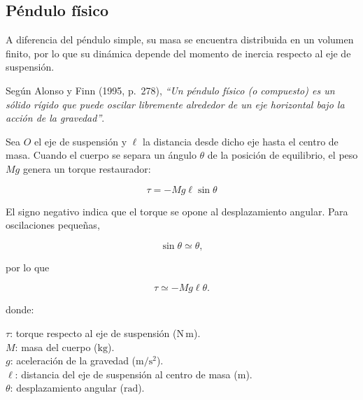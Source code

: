 \documentclass[11pt,a4paper]{article}
\newenvironment{subsectionbody}
{%
    \begin{list}{}{%
        \setlength{\leftmargin}{0.6cm}%
        \setlength{\rightmargin}{0cm}%
        \setlength{\topsep}{0pt}%
        \setlength{\partopsep}{0pt}%
        \setlength{\parsep}{0pt}%
        \setlength{\itemsep}{0pt}%
    }%
    \item\relax
}
{%
    \end{list}
}
\begin{document}
\subsection{Péndulo físico}
\begin{subsectionbody}

A diferencia del péndulo simple, su masa se encuentra distribuida en un volumen finito,
por lo que su dinámica depende del momento de inercia respecto al eje
de suspensión.

Según Alonso y Finn (1995, p.~278), \textit{``Un péndulo físico (o
compuesto) es un sólido rígido que puede oscilar libremente alrededor
de un eje horizontal bajo la acción de la gravedad''}.

Sea $O$ el eje de suspensión y $\ell$ la distancia desde dicho eje
hasta el centro de masa. Cuando el cuerpo se separa un ángulo $\theta$
de la posición de equilibrio, el peso $Mg$ genera un torque restaurador:

\[
\tau=-Mg\ell\sin\theta
\]

El signo negativo indica que el torque se opone al desplazamiento
angular. Para oscilaciones pequeñas,

\[
\sin\theta\simeq\theta,
\]

por lo que

\[
\tau\simeq-Mg\ell\theta.
\]

donde:

\hspace*{0.5cm}$\tau$: torque respecto al eje de suspensión
($\mathrm{N\,m}$).\\
\hspace*{0.5cm}$M$: masa del cuerpo ($\mathrm{kg}$).\\
\hspace*{0.5cm}$g$: aceleración de la gravedad ($\mathrm{m/s^2}$).\\
\hspace*{0.5cm}$\ell$: distancia del eje de suspensión al centro de masa
($\mathrm{m}$).\\
\hspace*{0.5cm}$\theta$: desplazamiento angular ($\mathrm{rad}$).

\end{subsectionbody}
\end{document}
